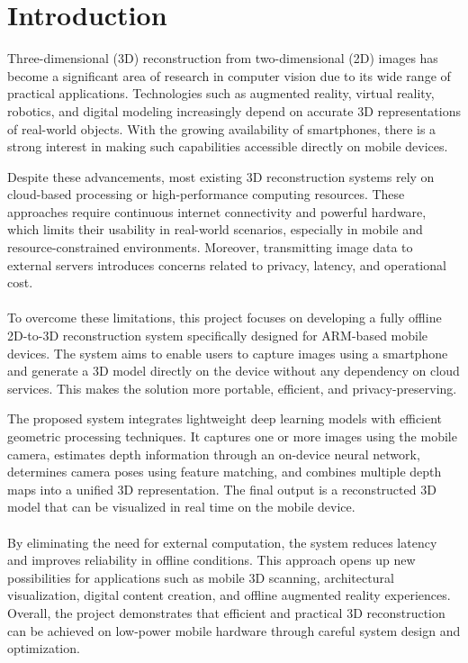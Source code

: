 \chapter{Introduction}

Three-dimensional (3D) reconstruction from two-dimensional (2D) images has become a significant area of research in computer vision due to its wide range of practical applications. Technologies such as augmented reality, virtual reality, robotics, and digital modeling increasingly depend on accurate 3D representations of real-world objects. With the growing availability of smartphones, there is a strong interest in making such capabilities accessible directly on mobile devices.

Despite these advancements, most existing 3D reconstruction systems rely on cloud-based processing or high-performance computing resources. These approaches require continuous internet connectivity and powerful hardware, which limits their usability in real-world scenarios, especially in mobile and resource-constrained environments. Moreover, transmitting image data to external servers introduces concerns related to privacy, latency, and operational cost. \\ \\

To overcome these limitations, this project focuses on developing a fully offline 2D-to-3D reconstruction system specifically designed for ARM-based mobile devices. The system aims to enable users to capture images using a smartphone and generate a 3D model directly on the device without any dependency on cloud services. This makes the solution more portable, efficient, and privacy-preserving.

The proposed system integrates lightweight deep learning models with efficient geometric processing techniques. It captures one or more images using the mobile camera, estimates depth information through an on-device neural network, determines camera poses using feature matching, and combines multiple depth maps into a unified 3D representation. The final output is a reconstructed 3D model that can be visualized in real time on the mobile device. \\ \\

By eliminating the need for external computation, the system reduces latency and improves reliability in offline conditions. This approach opens up new possibilities for applications such as mobile 3D scanning, architectural visualization, digital content creation, and offline augmented reality experiences. Overall, the project demonstrates that efficient and practical 3D reconstruction can be achieved on low-power mobile hardware through careful system design and optimization.



